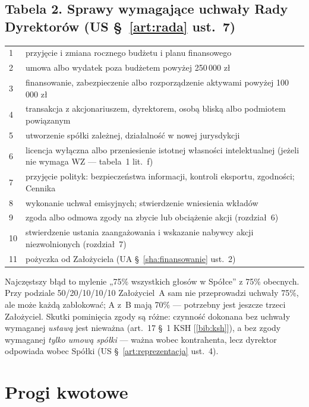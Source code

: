 \documentclass[11pt,a4paper]{report}
\newcommand{\Zr}[1]{[\ref{bib:#1}]}
\begin{document}
\subsection*{Tabela 2. Sprawy wymagające uchwały Rady Dyrektorów (US §~\ref{art:rada} ust.~7)}
\begin{tabularx}{\linewidth}{@{}p{0.6cm} X@{}}
\toprule
1 & przyjęcie i zmiana rocznego budżetu i planu finansowego \\
2 & umowa albo wydatek poza budżetem powyżej 250\,000 zł \\
3 & finansowanie, zabezpieczenie albo rozporządzenie aktywami powyżej 100\,000 zł \\
4 & transakcja z akcjonariuszem, dyrektorem, osobą bliską albo podmiotem powiązanym \\
5 & utworzenie spółki zależnej, działalność w nowej jurysdykcji \\
6 & licencja wyłączna albo przeniesienie istotnej własności intelektualnej (jeżeli nie wymaga WZ --- tabela~1 lit.~f) \\
7 & przyjęcie polityk: bezpieczeństwa informacji, kontroli eksportu, zgodności; Cennika \\
8 & wykonanie uchwał emisyjnych; stwierdzenie wniesienia wkładów \\
9 & zgoda albo odmowa zgody na zbycie lub obciążenie akcji (rozdział~6) \\
10 & stwierdzenie ustania zaangażowania i wskazanie nabywcy akcji niezwolnionych (rozdział~7) \\
11 & pożyczka od Założyciela (UA §~\ref{sha:finansowanie} ust.~2) \\
\bottomrule
\end{tabularx}

\begin{Komentarz}
Najczęstszy błąd to mylenie „75\% wszystkich głosów w Spółce” z 75\% obecnych. Przy podziale 50/20/10/10/10 Założyciel~A sam nie przeprowadzi uchwały 75\%, ale może każdą zablokować; A z~B mają 70\% --- potrzebny jest jeszcze trzeci Założyciel. Skutki pominięcia zgody są różne: czynność dokonana bez uchwały wymaganej \emph{ustawą} jest nieważna (art.~17 §~1 KSH \Zr{ksh}), a bez zgody wymaganej \emph{tylko umową spółki} --- ważna wobec kontrahenta, lecz dyrektor odpowiada wobec Spółki (US §~\ref{art:reprezentacja} ust.~4).
\end{Komentarz}

\section{Progi kwotowe}
\end{document}
